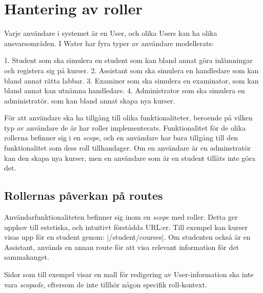 \section{Hantering av roller}

Varje användare i systemet är en User, och olika Users kan ha olika ansvarsområden. I Water har fyra typer av användare modellerats:

1. Student som ska simulera en student som kan bland annat göra inlämningar och registera sig på kurser.
2. Assistant som ska simulera en handledare som kan bland annat rätta labbar.
3. Examiner som ska simulera en examinator, som kan bland annat kan utnämna handledare.
4. Administrator som ska simulera en administratör, som kan bland annat skapa nya kurser.  
 
För att användare ska ha tillgång till olika funktionaliteter, beroende på vilken typ av användare de är har roller implementerats. Funktionalitet för de olika rollerna befinner sig i en \emph{scope}, och en användare har bara tillgång till den funktionalitet som dess roll tillhandager. Om en användare är en adminstratör kan den skapa nya kurser, men en användare som är en student tillåts inte göra det.

\subsection{Rollernas påverkan på routes}
Användarfunktionaliteten befinner sig inom en \emph{scope} med roller. Detta ger upphov till estetiska, och intuitivt förstådda URL:er. Till exempel kan kurser visas upp för en student genom: |/student/courses|. Om studenten också är en Assistant, används en annan route för att visa relevant information för det sammahanget.

Sidor som till exempel visar en mall för redigering av User-information ska inte vara \emph{scopade}, eftersom de inte tillhör någon specifik roll-kontext.
